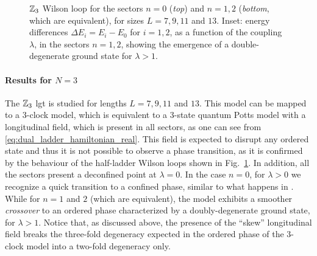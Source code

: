 \begin{figure}[t]
    \centering
    
    \vspace*{-10pt}
    \caption[Wilson loops for the $\Z_3$ ladder \ac{lgt}]{$\Z_3$ Wilson loop for the sectors $n=0$ (\emph{top}) and $n=1,2$ (\emph{bottom}, which are equivalent), for sizes $L = 7,9,11$ and $13$.
       Inset: energy differences $\Delta E_i = E_i - E_0$ for $i=1,2$, as a function of the coupling $\lambda$, in the sectors $n=1,2$, showing the emergence of a double-degenerate ground state for $\lambda > 1$.
}
    \label{fig:z3_wilson}
\end{figure}


\smallskip

\paragraph{Results for \texorpdfstring{$N=3$}{N=3}}%
The $\Z_3$ \ac{lgt} is studied for lengths $L=7,9,11$ and $13$.
This model can be mapped to a $3$-clock model, which is equivalent to a $3$-state quantum Potts model with a longitudinal field, which is present in all sectors, as one can see from \eqref{eq:dual_ladder_hamiltonian_real}.
This field is expected to disrupt any ordered state and thus it is not possible to observe a phase transition, as it is confirmed  by the behaviour of the half-ladder Wilson loops  shown in Fig.~\ref{fig:z3_wilson}.
In addition, all the sectors present a deconfined point at $\lambda = 0$.
In the case $n=0$, for $\lambda > 0$ we recognize a quick transition to a confined phase, similar to what happens in \cite{burrello2021ladder}.
While for $n=1$ and $2$ (which are equivalent), the model exhibits a smoother \emph{crossover} to an ordered phase characterized by a doubly-degenerate ground state, for $\lambda > 1$.
Notice that, as discussed above,  the presence of the ``skew'' longitudinal field breaks the three-fold degeneracy expected in the ordered phase of the $3$-clock model into a two-fold degeneracy only.

\smallskip

